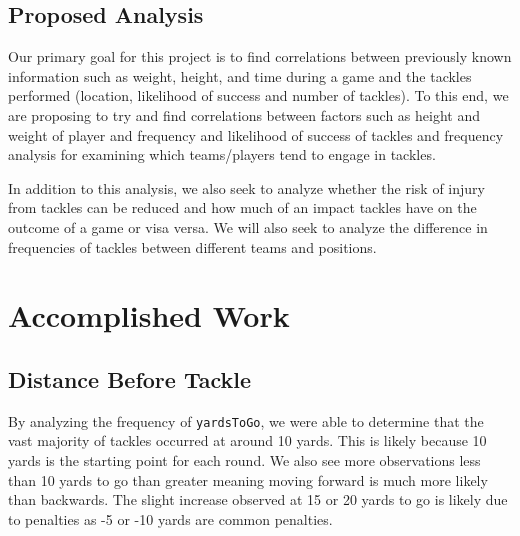 \documentclass[bibtex, sigconf, hyperref={colorlinks=true,linkcolor=blue,urlcolor=blue}]{acmart}
\begin{document}

\subsection{Proposed Analysis}

Our primary goal for this project is to find correlations between previously
known information such as weight, height, and time during a game and the tackles
performed (location, likelihood of success and number of tackles). To this end,
we are proposing to try and find correlations between factors such as height and
weight of player and frequency and likelihood of success of tackles and
frequency analysis for examining which teams/players tend to engage in tackles.


In addition to this analysis, we also seek to analyze whether the risk of injury
from tackles can be reduced and how much of an impact tackles have on the
outcome of a game or visa versa. We will also seek to analyze the difference in
frequencies of tackles between different teams and positions.

\section{Accomplished Work}

\subsection{Distance Before Tackle}

By analyzing the frequency of \verb|yardsToGo|, we were able to determine that
the vast majority of tackles occurred at around 10 yards. This is likely because
10 yards is the starting point for each round. We also see more observations
less than 10 yards to go than greater meaning moving forward is much more likely
than backwards.
The slight increase observed at 15 or 20 yards to go is likely due to penalties
as -5 or -10 yards are common penalties.
\end{document}
